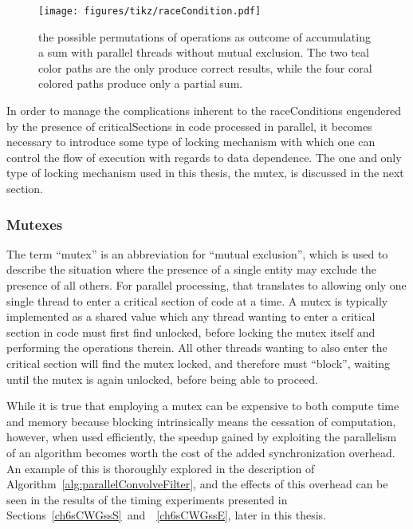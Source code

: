 \begin{figure}[ht]
\ffigbox
	{\texttt{[image: figures/tikz/raceCondition.pdf]}}
	{\caption[A Simple Race Condition]{the possible permutations of operations as outcome of accumulating a sum with parallel threads without mutual exclusion. The two teal color paths are the only produce correct results, while the four coral colored paths produce only a partial sum.}\label{fig:raceCondition}}
\end{figure}

In order to manage the complications inherent to the \glspl{raceCondition} engendered by the presence of \glspl{criticalSection} in code processed in parallel, it becomes necessary to introduce some type of locking mechanism with which one can control the flow of execution with regards to data dependence. The one and only type of locking mechanism used in this thesis, the mutex, is discussed in the next section.

%
%
\subsubsection{Mutexes}
\label{ch2sPPssPCsssM}
The term ``\gls{mutex}'' is an abbreviation for ``mutual exclusion'', which is used to describe the situation where the presence of a single entity may exclude the presence of all others. For parallel processing, that translates to allowing only one single thread to enter a critical section of code at a time. A mutex is typically implemented as a shared value which any thread wanting to enter a critical section in code must first find unlocked, before locking the mutex itself and performing the operations therein. All other threads wanting to also enter the critical section will find the mutex locked, and therefore must ``block'', waiting until the mutex is again unlocked, before being able to proceed.

While it is true that employing a mutex can be expensive to both compute time and memory because blocking intrinsically means the cessation of computation, however, when used efficiently, the speedup gained by exploiting the parallelism of an algorithm becomes worth the cost of the added synchronization overhead.~\cite[~p.20]{Lang17} An example of this is thoroughly explored in the description of Algorithm~\ref{alg:parallelConvolveFilter}, and the effects of this overhead can be seen in the results of the timing experiments presented in Sections~\ref{ch6sCWGssS}~and~~\ref{ch6sCWGssE}, later in this thesis.

